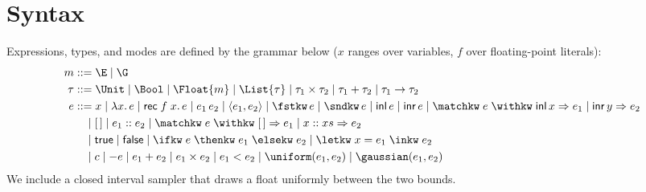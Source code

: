 \section{Syntax}
Expressions, types, and modes are defined by the grammar below (\(x\) ranges over variables, \(f\) over floating-point literals):
\begin{align*}
  m &::= \E \mid \G \\
  \tau &::= \Unit \mid \Bool \mid \Float{m} \mid \List{\tau} \mid \tau_1 \times \tau_2 \mid \tau_1 + \tau_2 \mid \tau_1 \to \tau_2 \\
  e &::= x \mid \lambda x.\,e \mid \mathsf{rec}\;f\;x.\,e \mid e_1\,e_2 \mid \langle e_1, e_2\rangle \mid \fstkw\,e \mid \sndkw\,e \mid \mathsf{inl}\,e \mid \mathsf{inr}\,e \mid \matchkw\;e\;\withkw\;\mathsf{inl}\,x \Rightarrow e_1 \mid \mathsf{inr}\,y \Rightarrow e_2 \\
    &\quad\mid [\,] \mid e_1 :: e_2 \mid \matchkw\;e\;\withkw\;[\,] \Rightarrow e_1 \mid x::xs \Rightarrow e_2 \\
    &\quad\mid \mathsf{true} \mid \mathsf{false} \mid \ifkw\;e\;\thenkw\;e_1\;\elsekw\;e_2 \mid \letkw\;x=e_1\;\inkw\;e_2 \\
    &\quad\mid c \mid -e \mid e_1 + e_2 \mid e_1 \times e_2 \mid e_1 < e_2 \mid \uniform(e_1,e_2) \mid \gaussian(e_1,e_2)
\end{align*}
We include a closed interval sampler that draws a float uniformly between the two bounds.

